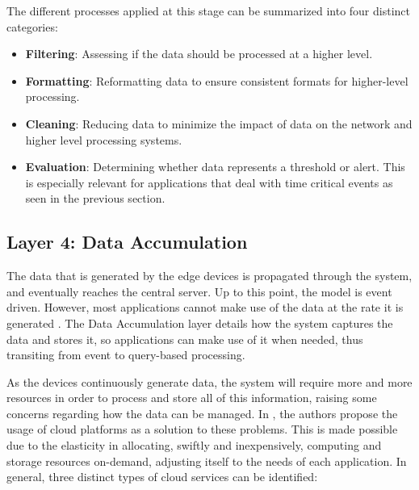 The different processes applied at this stage can be summarized into four distinct categories:

\begin{itemize}
    \item \textbf{Filtering}: Assessing if the data should be processed at a higher level. 
    \item \textbf{Formatting}: Reformatting data to ensure consistent formats for higher-level processing.
    \item \textbf{Cleaning}: Reducing data to minimize the impact of data on the network and higher level processing systems.
    \item \textbf{Evaluation}: Determining whether data represents a threshold or alert. This is especially relevant for applications that deal with time critical events as seen in the previous section.
\end{itemize}


\subsection{Layer 4: Data Accumulation}
\label{sec:iot-model-layer4}

The data that is generated by the edge devices is propagated through the system, and eventually reaches the central server. Up to this point, the model is event driven. However, most applications cannot make use of the data at the rate it is generated \cite{10.5555/3161403}. The Data Accumulation layer details how the system captures the data and stores it, so applications can make use of it when needed, thus transiting from event to query-based processing. \bigskip

As the devices continuously generate data, the system will require more and more resources in order to process and store all of this information, raising some concerns regarding how the data can be managed. In \cite{Doukas2012}, the authors propose the usage of cloud platforms as a solution to these problems. This is made possible due to the elasticity in allocating, swiftly and inexpensively, computing and storage resources on-demand, adjusting itself to the needs of each application. In general, three distinct types of cloud services can be identified: 

